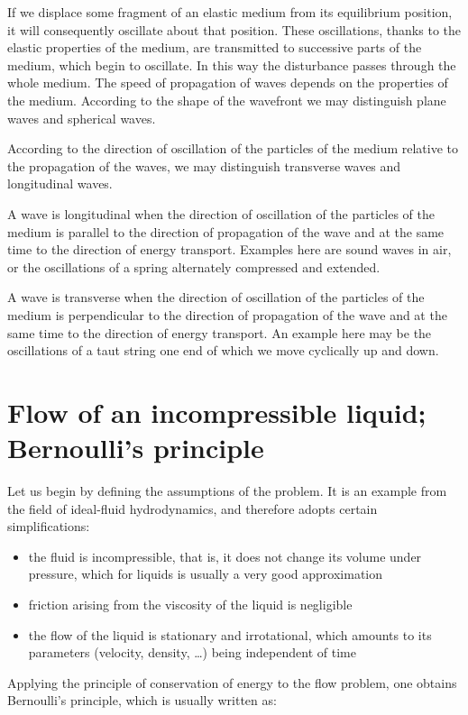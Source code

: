If we displace some fragment of an elastic medium from its equilibrium position, it will consequently oscillate about that position. These oscillations, thanks to the elastic properties of the medium, are transmitted to successive parts of the medium, which begin to oscillate. In this way the disturbance passes through the whole medium. The speed of propagation of waves depends on the properties of the medium. According to the shape of the wavefront we may distinguish plane waves and spherical waves.

According to the direction of oscillation of the particles of the medium relative to the propagation of the waves, we may distinguish transverse waves and longitudinal waves.

A wave is longitudinal when the direction of oscillation of the particles of the medium is parallel to the direction of propagation of the wave and at the same time to the direction of energy transport. Examples here are sound waves in air, or the oscillations of a spring alternately compressed and extended.

A wave is transverse when the direction of oscillation of the particles of the medium is perpendicular to the direction of propagation of the wave and at the same time to the direction of energy transport. An example here may be the oscillations of a taut string one end of which we move cyclically up and down.

\section{Flow of an incompressible liquid; Bernoulli's principle}

Let us begin by defining the assumptions of the problem. It is an example from the field of ideal-fluid hydrodynamics, and therefore adopts certain simplifications:

\begin{itemize}
    \item the fluid is incompressible, that is, it does not change its volume under pressure, which for liquids is usually a very good approximation
    \item friction arising from the viscosity of the liquid is negligible
    \item the flow of the liquid is stationary and irrotational, which amounts to its parameters (velocity, density, \ldots) being independent of time
\end{itemize}

Applying the principle of conservation of energy to the flow problem, one obtains Bernoulli's principle, which is usually written as:

